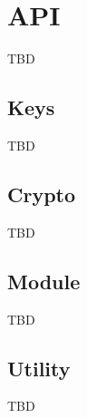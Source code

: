 \chapter{API}
\label{chap:API}

TBD

\section{Keys}
\label{sec:Keys}

TBD

\section{Crypto}
\label{sec:Crypto}

TBD

\section{Module}
\label{sec:Module}

TBD

\section{Utility}
\label{sec:Utiliy}

TBD
